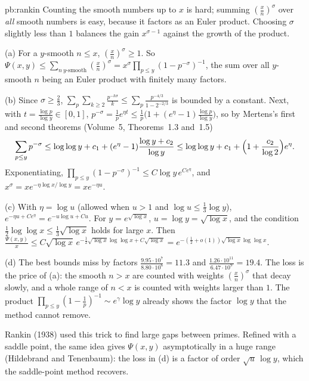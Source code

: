 \begin{solution}{pb:rankin}
\idea Counting the smooth numbers up to $x$ is hard; summing $(\frac xn)^\sigma$ over \emph{all} smooth numbers is easy, because it factors as an Euler product. Choosing $\sigma$ slightly less
than $1$ balances the gain $x^{\sigma-1}$ against the growth of the product.

\writeup (a) For a $y$-smooth $n\le x$, $(\frac xn)^\sigma\ge1$. So $\Psi(x,y)\le\sum_{n\ y\text{-smooth}}(\frac xn)^\sigma=x^\sigma\prod_{p\le y}(1-p^{-\sigma})^{-1}$, the sum over all
$y$-smooth $n$ being an Euler product with finitely many factors.

(b) Since $\sigma\ge\frac23$, $\sum_p\sum_{k\ge2}\frac{p^{-k\sigma}}k\le\sum_p\frac{p^{-4/3}}{1-2^{-2/3}}$ is bounded by a constant. Next, with $t=\frac{\log p}{\log y}\in[0,1]$,
$p^{-\sigma}=\frac1pe^{\eta t}\le\frac1p\bigl(1+(e^\eta-1)\frac{\log p}{\log y}\bigr)$, so by Mertens's first and second theorems (Volume~5, Theorems~1.3 and~1.5)
\[
\sum_{p\le y}p^{-\sigma}\le\log\log y+c_1+(e^\eta-1)\frac{\log y+c_2}{\log y}\le\log\log y+c_1+\Bigl(1+\frac{c_2}{\log2}\Bigr)e^\eta.
\]
Exponentiating, $\prod_{p\le y}(1-p^{-\sigma})^{-1}\le C\log y\,e^{Ce^\eta}$, and $x^\sigma=xe^{-\eta\log x/\log y}=xe^{-\eta u}$.

(c) With $\eta=\log u$ (allowed when $u>1$ and $\log u\le\frac13\log y$), $e^{-\eta u+Ce^\eta}=e^{-u\log u+Cu}$. For $y=e^{\sqrt{\log x}}$, $u=\log y=\sqrt{\log x}$, and the condition
$\frac12\log\log x\le\frac13\sqrt{\log x}$ holds for large $x$. Then $\frac{\Psi(x,y)}x\le C\sqrt{\log x}\,e^{-\frac12\sqrt{\log x}\log\log x+C\sqrt{\log x}}=e^{-(\frac12+o(1))\sqrt{\log x}\log\log x}$.

(d) The best bounds miss by factors $\frac{9.95\cdot10^7}{8.80\cdot10^6}=11.3$ and $\frac{1.26\cdot10^{11}}{6.47\cdot10^9}=19.4$. The loss is the price of (a): the smooth $n>x$ are counted with weights
$(\frac xn)^\sigma$ that decay slowly, and a whole range of $n<x$ is counted with weights larger than $1$. The product $\prod_{p\le y}(1-\frac1p)^{-1}\sim e^\gamma\log y$ already shows the
factor $\log y$ that the method cannot remove.

\leads Rankin (1938) used this trick to find large gaps between primes. Refined with a saddle point, the same idea gives $\Psi(x,y)$ asymptotically in a huge range (Hildebrand and Tenenbaum):
the loss in (d) is a factor of order $\sqrt u\,\log y$, which the saddle-point method recovers.
\end{solution}

